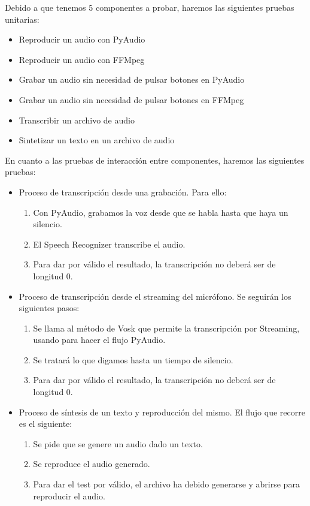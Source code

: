 Debido a que tenemos 5 componentes a probar, haremos las siguientes pruebas unitarias:
\begin{itemize}
	\item Reproducir un audio con PyAudio
	\item Reproducir un audio con FFMpeg
	\item Grabar un audio sin necesidad de pulsar botones en PyAudio
	\item Grabar un audio sin necesidad de pulsar botones en FFMpeg
	\item Transcribir un archivo de audio
	\item Sintetizar un texto en un archivo de audio
\end{itemize}

En cuanto a las pruebas de interacción entre componentes, haremos las siguientes pruebas:
\begin{itemize}
	\item Proceso de transcripción desde una grabación. Para ello:
	\begin{enumerate}
		\item Con PyAudio, grabamos la voz desde que se habla hasta que haya un silencio.
		\item El Speech Recognizer transcribe el audio.
		\item Para dar por válido el resultado, la transcripción no deberá ser de longitud 0.
	\end{enumerate}
	\item Proceso de transcripción desde el streaming del micrófono. Se seguirán los siguientes pasos:
	\begin{enumerate}
		\item Se llama al método de Vosk que permite la transcripción por Streaming, usando para hacer el flujo PyAudio.
		\item Se tratará lo que digamos hasta un tiempo de silencio.
		\item Para dar por válido el resultado, la transcripción no deberá ser de longitud 0.
	\end{enumerate}
	\item Proceso de síntesis de un texto y reproducción del mismo. El flujo que recorre es el siguiente:
	\begin{enumerate}
		\item Se pide que se genere un audio dado un texto.
		\item Se reproduce el audio generado.
		\item Para dar el test por válido, el archivo ha debido generarse y abrirse para reproducir el audio. 
	\end{enumerate}
\end{itemize}

